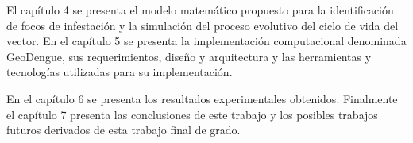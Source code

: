El capítulo 4 se presenta el modelo matemático propuesto para la identificación de focos de
infestación y la simulación del proceso evolutivo del ciclo de vida del vector. En el capítulo 5
se presenta la implementación computacional denominada GeoDengue, sus requerimientos, diseño y
arquitectura y las herramientas y tecnologías utilizadas para su implementación.

En el capítulo 6 se presenta los resultados experimentales obtenidos. Finalmente el capítulo 7
presenta las conclusiones de este trabajo y los posibles trabajos futuros derivados de esta trabajo final de grado.

